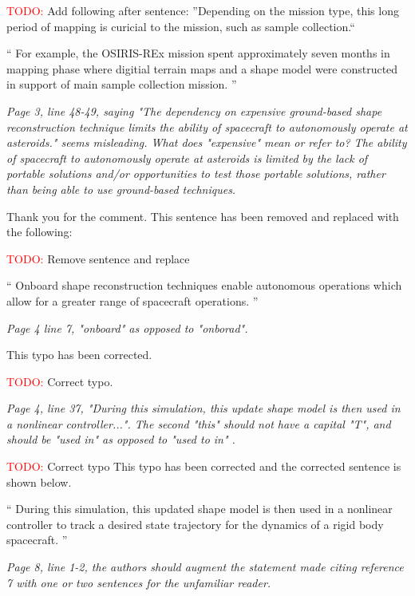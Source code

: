 \documentclass[11pt]{article}
\newcommand{\todo}{{\large \textcolor{red}{TODO: }}}
\newenvironment{correction}{\begin{list}{}{\setlength{\leftmargin}{1cm}\setlength{\rightmargin}{1cm}}\vspace{\parsep}\item[]``}{''\end{list}}
\newcommand{\comment}[1]{\item \itshape #1 \normalfont}
\begin{document}
\begin{itemize}
\todo Add following after sentence: ''Depending on the mission type, this long period of mapping is curicial to the mission, such as sample collection.``
\begin{correction}
For example, the OSIRIS-REx mission spent approximately seven months in mapping phase where digitial terrain maps and a shape model were constructed in support of main sample collection mission.
\end{correction}

\comment{
Page 3, line 48-49, saying "The dependency on expensive ground-based shape reconstruction technique limits the ability of spacecraft to autonomously operate at asteroids." seems misleading.
What does "expensive" mean or refer to? The ability of spacecraft to autonomously operate at asteroids is limited by the lack of portable solutions and/or opportunities to test those portable solutions, rather than being able to use ground-based techniques.
}

Thank you for the comment.
This sentence has been removed and replaced with the following:

\todo Remove sentence and replace

\begin{correction}
Onboard shape reconstruction techniques enable autonomous operations which allow for a greater range of spacecraft operations.
\end{correction}


\comment{
Page 4 line 7, "onboard" as opposed to "onborad".
}

This typo has been corrected.

\todo Correct typo.

\comment{
Page 4, line 37, "During this simulation, this update shape model is then used in a nonlinear controller...". The second "this" should not have a capital "T", and should be "used in" as opposed to "used to in" .
}

\todo Correct typo
This typo has been corrected and the corrected sentence is shown below.

\begin{correction}
During this simulation, this updated shape model is then used in a nonlinear controller to track a desired state trajectory for the dynamics of a rigid body spacecraft.
\end{correction}

\comment{
Page 8, line 1-2, the authors should augment the statement made citing reference 7 with one or two sentences for the unfamiliar reader.  
}


\end{itemize}
\end{document}

